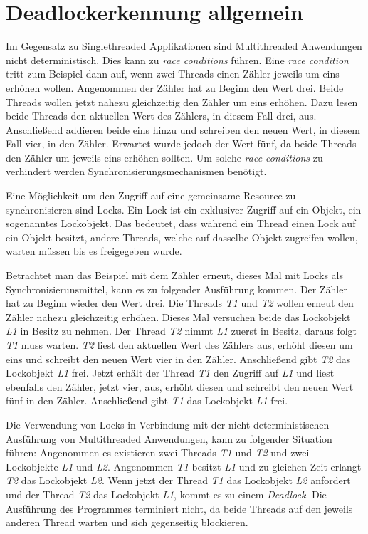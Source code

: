\section{Deadlockerkennung allgemein}
Im Gegensatz zu Singlethreaded Applikationen sind Multithreaded Anwendungen
nicht deterministisch. Dies kann zu \textit{race conditions} führen. Eine
\textit{race condition} tritt zum Beispiel dann auf, wenn zwei Threads einen
Zähler jeweils um eins erhöhen wollen. Angenommen der Zähler hat zu Beginn den
Wert drei. Beide Threads wollen jetzt nahezu gleichzeitig den Zähler um eins
erhöhen. Dazu lesen beide Threads den aktuellen Wert des Zählers, in diesem Fall
drei, aus. Anschließend addieren beide eins hinzu und schreiben den neuen Wert,
in diesem Fall vier, in den Zähler. Erwartet wurde jedoch der Wert fünf, da
beide Threads den Zähler um jeweils eins erhöhen sollten. Um solche
\textit{race conditions} zu verhindert werden Synchronisierungsmechanismen
benötigt.

Eine Möglichkeit um den Zugriff auf eine gemeinsame Resource zu synchronisieren
sind Locks. Ein Lock ist ein exklusiver Zugriff auf ein Objekt, ein sogenanntes
Lockobjekt. Das bedeutet, dass während ein Thread einen Lock auf ein Objekt
besitzt, andere Threads, welche auf dasselbe Objekt zugreifen wollen, warten
müssen bis es freigegeben wurde.

Betrachtet man das Beispiel mit dem Zähler erneut, dieses Mal mit Locks als
Synchronisierunsmittel, kann es zu folgender Ausführung kommen. Der Zähler hat
zu Beginn wieder den Wert drei. Die Threads \textit{T1} und \textit{T2} wollen
erneut den Zähler nahezu gleichzeitig erhöhen. Dieses Mal versuchen beide das
Lockobjekt \textit{L1} in Besitz zu nehmen. Der Thread \textit{T2} nimmt
\textit{L1} zuerst in Besitz, daraus folgt \textit{T1} muss warten. \textit{T2}
liest den aktuellen Wert des Zählers aus, erhöht diesen um eins und schreibt den
neuen Wert vier in den Zähler. Anschließend gibt \textit{T2} das Lockobjekt
\textit{L1} frei. Jetzt erhält der Thread \textit{T1} den Zugriff auf
\textit{L1} und liest ebenfalls den Zähler, jetzt vier, aus, erhöht diesen und
schreibt den neuen Wert fünf in den Zähler. Anschließend gibt \textit{T1} das
Lockobjekt \textit{L1} frei.

Die Verwendung von Locks in Verbindung mit der nicht deterministischen
Ausführung von Multithreaded Anwendungen, kann zu folgender Situation führen:
Angenommen es existieren zwei Threads \textit{T1} und \textit{T2} und zwei
Lockobjekte \textit{L1} und \textit{L2}. Angenommen \textit{T1} besitzt
\textit{L1} und zu gleichen Zeit erlangt \textit{T2} das Lockobjekt \textit{L2}.
Wenn jetzt der Thread \textit{T1} das Lockobjekt \textit{L2} anfordert und der
Thread \textit{T2} das Lockobjekt \textit{L1}, kommt es zu einem
\textit{Deadlock}. Die Ausführung des Programmes terminiert nicht, da beide
Threads auf den jeweils anderen Thread warten und sich gegenseitig
blockieren.

